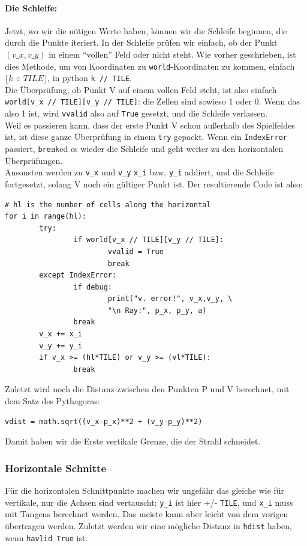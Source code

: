\documentclass[a4paper,12pt]{report}
\begin{document}
\paragraph{Die Schleife:}
Jetzt, wo wir die nötigen Werte haben, können wir die Schleife beginnen, die durch die Punkte iteriert. In der Schleife prüfen wir einfach, ob der Punkt $(v\_x,v\_y)$ in einem ``vollen'' Feld oder nicht steht. Wie vorher geschrieben, ist dies Methode, um von Koordinaten zu \texttt{world}-Koordinaten zu kommen, einfach $\lfloor k \div TILE \rfloor$, in python \texttt{k // TILE}. \\
Die Überprüfung, ob Punkt V auf einem vollen Feld steht, ist also einfach \texttt{world[v\_x // TILE][v\_y // TILE]}: die Zellen sind sowieso 1 oder 0. Wenn das also 1 ist, wird \texttt{vvalid} also auf \texttt{True} gesetzt, und die Schleife verlassen. \\
Weil es passieren kann, dass der erste Punkt V schon außerhalb des Spielfeldes ist, ist diese ganze Überprüfung in einem \texttt{try} gepackt. Wenn ein \texttt{IndexError} passiert, \texttt{break}ed es wieder die Schleife und geht weiter zu den horizontalen Überprüfungen. \\
Ansonsten werden zu \texttt{v\_x} und \texttt{v\_y} \texttt{x\_i} bzw. \texttt{y\_i} addiert, und die Schleife fortgesetzt, solang V noch ein gültiger Punkt ist. Der resultierende Code ist also:
\begin{Verbatim}[baselinestretch=1.0, xleftmargin=1cm]
# hl is the number of cells along the horizontal
for i in range(hl):
        try:
                if world[v_x // TILE][v_y // TILE]:
                        vvalid = True
                        break
        except IndexError:
                if debug:
                        print("v. error!", v_x,v_y, \
                        "\n Ray:", p_x, p_y, a)
                break
        v_x += x_i
        v_y += y_i
        if v_x >= (hl*TILE) or v_y >= (vl*TILE):
                break
\end{Verbatim}

Zuletzt wird noch die Distanz zwischen den Punkten P und V berechnet, mit dem Satz des Pythagoras:
\begin{Verbatim}[baselinestretch=1.0, xleftmargin=1cm]
vdist = math.sqrt((v_x-p_x)**2 + (v_y-p_y)**2)
\end{Verbatim}
Damit haben wir die Erste vertikale Grenze, die der Strahl schneidet.

\subsubsection{Horizontale Schnitte}
Für die horizontalen Schnittpunkte machen wir ungefähr das gleiche wie für vertikale, nur die Achsen sind vertauscht: \texttt{y\_i} ist hier +/- \texttt{TILE}, und \texttt{x\_i} muss mit Tangens berechnet werden. Das meiste kann aber leicht von dem vorigen übertragen werden. Zuletzt werden wir eine mögliche Distanz in \texttt{hdist} haben, wenn \texttt{havlid True} ist.
\end{document}
